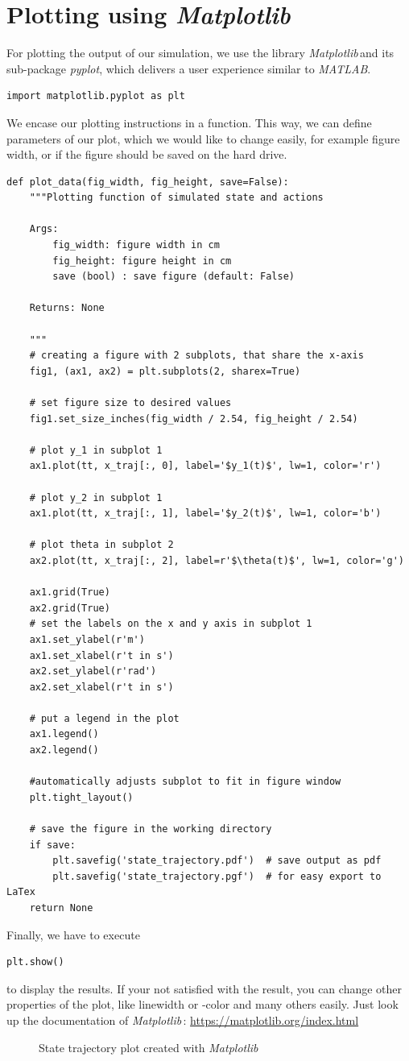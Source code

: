 \documentclass{article}
\newcommand{\mpl}{\emph{Matplotlib}\,}
\begin{document}
\section{Plotting using \mpl}
\label{sec:plot}
For plotting the output of our simulation, we use the library \mpl and its sub-package \emph{pyplot}, which delivers a user experience similar to \emph{MATLAB}.
\begin{lstlisting}
import matplotlib.pyplot as plt
\end{lstlisting}
We encase our plotting instructions in a function. This way, we can define parameters of our plot, which we would like to change easily, for example figure width, or if the figure should be saved on the hard drive.
\begin{lstlisting}
def plot_data(fig_width, fig_height, save=False):
    """Plotting function of simulated state and actions

    Args:
        fig_width: figure width in cm
        fig_height: figure height in cm
        save (bool) : save figure (default: False)

    Returns: None

    """
    # creating a figure with 2 subplots, that share the x-axis
    fig1, (ax1, ax2) = plt.subplots(2, sharex=True)

    # set figure size to desired values
    fig1.set_size_inches(fig_width / 2.54, fig_height / 2.54)

    # plot y_1 in subplot 1
    ax1.plot(tt, x_traj[:, 0], label='$y_1(t)$', lw=1, color='r')

    # plot y_2 in subplot 1
    ax1.plot(tt, x_traj[:, 1], label='$y_2(t)$', lw=1, color='b')

    # plot theta in subplot 2
    ax2.plot(tt, x_traj[:, 2], label=r'$\theta(t)$', lw=1, color='g')

    ax1.grid(True)
    ax2.grid(True)
    # set the labels on the x and y axis in subplot 1
    ax1.set_ylabel(r'm')
    ax1.set_xlabel(r't in s')
    ax2.set_ylabel(r'rad')
    ax2.set_xlabel(r't in s')

    # put a legend in the plot
    ax1.legend()
    ax2.legend()

    #automatically adjusts subplot to fit in figure window
    plt.tight_layout()

    # save the figure in the working directory
    if save:
        plt.savefig('state_trajectory.pdf')  # save output as pdf
        plt.savefig('state_trajectory.pgf')  # for easy export to LaTex
    return None
\end{lstlisting}
Finally, we have to execute
\begin{lstlisting}
plt.show()
\end{lstlisting}
to display the results. If your not satisfied with the result, you can change other properties of the plot, like linewidth or -color and many others easily. Just look up the documentation of \mpl : \url{https://matplotlib.org/index.html}
\begin{figure}[h]
\label{fig:state_traj}
   \centering      
         
 \caption{State trajectory plot created with \mpl}
 \label{fig:Test}
\end{figure} 
\end{document}
